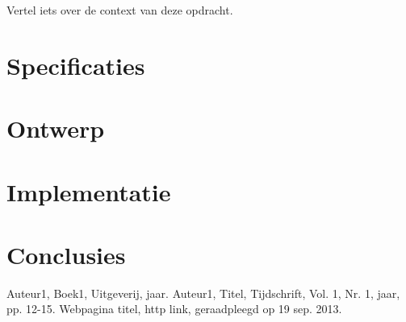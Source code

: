 \documentclass{report}
\begin{document}
\newcommand{\rp}{$\rightarrow$}
\newcommand{\Ohm}{$\Omega$}
\newcommand{\ohm}{$\omega$}
\newcommand{\gmu}{$\mu$}
\newcommand{\tss}{\textsubscript}
\newcommand{\ci}{} %


\tableofcontents
{}
Vertel iets over de context van deze opdracht.

\section{Specificaties}


\section{Ontwerp}



\section{Implementatie}



\section{Conclusies}


\begin{thebibliography}{9}
Auteur1, 
Boek1, 
Uitgeverij, 
jaar.
Auteur1, 
Titel, 
Tijdschrift, 
Vol. 1, 
Nr. 1, 
jaar, 
pp. 12-15.
Webpagina titel, 
http link, 
geraadpleegd op 19 sep. 2013.
\end{thebibliography}
\end{document}
